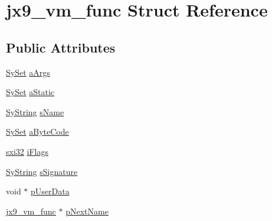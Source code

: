 \hypertarget{structjx9__vm__func}{\section{jx9\-\_\-vm\-\_\-func Struct Reference}
\label{d6/d2b/structjx9__vm__func}
}
\subsection*{Public Attributes}
\begin{DoxyCompactItemize}
\item 
\hyperlink{struct_sy_set}{Sy\-Set} \hyperlink{structjx9__vm__func_aab6110c8f99e2c95eafecef2bd01f7d4}{a\-Args}
\item 
\hyperlink{struct_sy_set}{Sy\-Set} \hyperlink{structjx9__vm__func_af28cdd4cbc3ebc6daa004beff7b4c654}{a\-Static}
\item 
\hyperlink{struct_sy_string}{Sy\-String} \hyperlink{structjx9__vm__func_a5ecdbf6df9611fdfa188c3e98e9da4a0}{s\-Name}
\item 
\hyperlink{struct_sy_set}{Sy\-Set} \hyperlink{structjx9__vm__func_a64012215241b4484795aae8df3601b76}{a\-Byte\-Code}
\item 
\hyperlink{unqlite_8c_a5a58035d4ae379178e2ca46cc3272fc5}{sxi32} \hyperlink{structjx9__vm__func_ac942cf2cf953fd066c529fdf015ed2b6}{i\-Flags}
\item 
\hyperlink{struct_sy_string}{Sy\-String} \hyperlink{structjx9__vm__func_a04014223ad6a7843a47e26eca1fd04fb}{s\-Signature}
\item 
void $\ast$ \hyperlink{structjx9__vm__func_aa992349aa68b1dfb499fb89a3f57b290}{p\-User\-Data}
\item 
\hyperlink{structjx9__vm__func}{jx9\-\_\-vm\-\_\-func} $\ast$ \hyperlink{structjx9__vm__func_a983c27ca0e5d273ef0791e5ef6cf6cb4}{p\-Next\-Name}
\end{DoxyCompactItemize}


